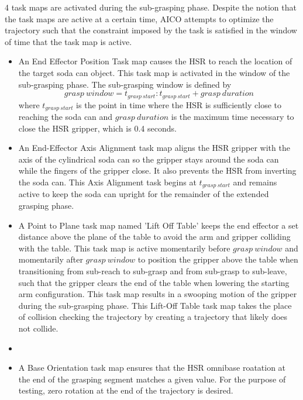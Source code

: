 \documentclass[12pt]{article}
\begin{document}
                4 task maps are activated during the sub-grasping phase. Despite the notion that the task maps are active at a certain time, AICO attempts to optimize the trajectory such that the constraint imposed by the task is satisfied in the window of time that the task map is active.
                \begin{itemize}
                    \item An End Effector Position Task map causes the HSR to reach the location of the target soda can object. This task map is activated in the window of the sub-grasping phase. The sub-grasping window is defined by 
                    \[{grasp\ window} = t_{grasp\ start}: t_{grasp\ start}+grasp\  duration\] 
                    where \(t_{grasp\ start}\) is the point in time where the HSR is sufficiently close to reaching the soda can and \({grasp\ duration}\) is the maximum time necessary to close the HSR gripper, which is 0.4 seconds.

                    \item An End-Effector Axis Alignment task map aligns the HSR gripper with the axis of the cylindrical soda can so the gripper stays around the soda can while the fingers of the gripper close. It also prevents the HSR from inverting the soda can. This Axis Alignment task begins at \(t_{grasp\ start}\) and remains active to keep the soda can upright for the remainder of the extended grasping phase.

                    \item A Point to Plane task map named 'Lift Off Table' keeps the end effector a set distance above the plane of the table to avoid the arm and gripper colliding with the table. This task map is active momentarily before \({grasp\ window}\) and momentarily after \({grasp\ window}\) to position the gripper above the table when transitioning from sub-reach to sub-grasp and from sub-grasp to sub-leave, such that the gripper clears the end of the table when lowering the starting arm configuration. This task map results in a swooping motion of the gripper during the sub-grasping phase. This Lift-Off Table task map takes the place of collision checking the trajectory by creating a trajectory that likely does not collide.
                    \item 
                    \item A Base Orientation task map ensures that the HSR omnibase roatation at the end of the grasping segment matches a given value. For the purpose of testing, zero rotation at the end of the trajectory is desired.
                \end{itemize}
\end{document}
